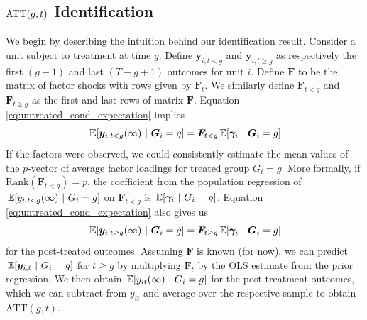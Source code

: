 \subsection{\texorpdfstring{$\text{ATT}(g,t)$}{ATT(g,t)} Identification}\label{sec:ATT_identification}

We begin by describing the intuition behind our identification result. Consider a unit subject to treatment at time $g$. Define $\bm y_{i,t<g}$ and $\bm y_{i,t\geq g}$ as respectively the first $(g-1)$ and last $(T-g+1)$ outcomes for unit $i$. Define $\bm{F}$ to be the matrix of factor shocks with rows given by $\bm{F}_t$. We similarly define $\bm{F}_{t < g}$ and $\bm{F}_{t \geq g}$ as the first and last rows of matrix $\bm{F}$. Equation \eqref{eq:untreated_cond_expectation} implies
\begin{equation}
  \expec{\bm y_{i,t < g}(\infty)}{ \bm G_i = g} = \bm{F}_{t < g} \expec{\bm \gamma_i}{\bm G_i = g}
\end{equation}
If the factors were observed, we could consistently estimate the mean values of the $p$-vector of average factor loadings for treated group $G_i = g$. More formally, if $\text{Rank}(\bm{F}_{t < g}) = p$, the coefficient from the population regression of $\expec{y_{i,t < g}(\infty) }{ G_i = g}$ on $\bm{F}_{t < g}$ is $\expec{\bm \gamma_i}{G_i = g}$. Equation \eqref{eq:untreated_cond_expectation} also gives us 
\begin{equation}
  \expec{\bm y_{i,t \geq g}(\infty)}{ \bm G_i = g} = \bm{F}_{t \geq g} \expec{\bm \gamma_i}{\bm G_i = g}
\end{equation}
for the post-treated outcomes. Assuming $\bm{F}$ is known (for now), we can predict $\expec{\bm y_{i,t}}{G_i = g}$ for $t \geq g$ by multiplying $\bm{F}_t$  by the OLS estimate from the prior regression. We then obtain $\expec{y_{it}(\infty)}{G_i = g}$ for the post-treatment outcomes, which we can subtract from $y_{i t}$ and average over the respective sample to obtain $\text{ATT}(g,t)$. 

